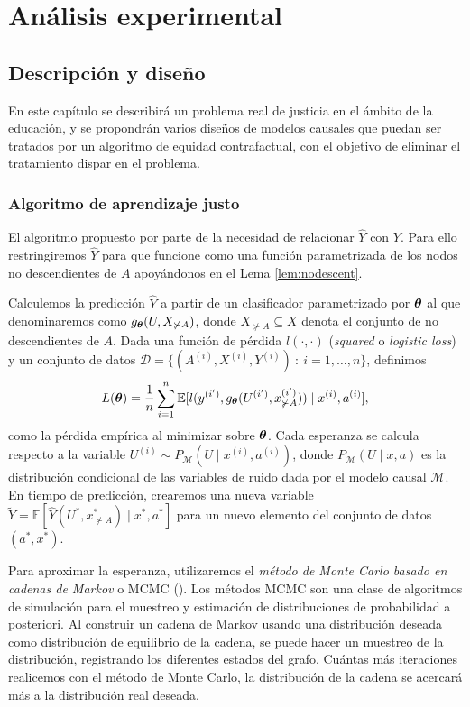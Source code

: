 \documentclass[oneside,openright,titlepage,numbers=noenddot,openany,headinclude,footinclude=true,
cleardoublepage=empty,abstractoff,BCOR=5mm,paper=a4,fontsize=12pt,main=spanish]{scrreprt}
\begin{document}
\part{Análisis experimental}  \label{part:analisis_exp}


\chapter{Descripción y diseño} \label{ch:descdise}

En este capítulo se describirá un problema real de justicia en el ámbito de la educación, y se propondrán varios diseños de modelos causales que puedan ser tratados por un algoritmo de equidad contrafactual, con el objetivo de eliminar el tratamiento dispar en el problema.

\section{Algoritmo de aprendizaje justo}

\label{sec:algoritmo}

El algoritmo propuesto por \cite{counterfactual2018} parte de la necesidad de relacionar $\hat{Y}$ con $Y$. Para ello restringiremos $\hat{Y}$ para que funcione como una función parametrizada de los nodos no descendientes de $A$ apoyándonos en el Lema \ref{lem:nodescent}. 

Calculemos la predicción $\hat{Y}$ a partir de un clasificador parametrizado por $\bm{\theta}$ al que denominaremos como $g_{\bm{\theta}}(U,X_{\not \succ A})$, donde $X_{\not \succ A} \subseteq X$ denota el conjunto de no descendientes de $A$. Dada una función de pérdida $l(\cdot,\cdot)$ (\textit{squared} o \textit{logistic loss}) y un conjunto de datos $\mathcal{D}=\{(A^{(i)},X^{(i)},Y^{(i)}) \ : \ i=1,\dots,n\}$, definimos $$L(\bm{\theta})=\displaystyle \frac{1}{n} \sum_{i=1}^n \mathbb{E}[l(y^{(i')},g_{\bm{\theta}}(U^{(i')},x_{\not \succ A}^{(i')}))\mid x^{(i)},a^{(i)}],$$ como la pérdida empírica al minimizar sobre $\bm{\theta}$. Cada esperanza se calcula respecto a la variable $U^{(i)} \sim P_{\mathcal{M}}(U \mid x^{(i)},a^{(i)})$, donde $P_{\mathcal{M}}(U \mid x,a)$ es la distribución condicional de las variables de ruido dada por el modelo causal $\mathcal{M}$. En tiempo de predicción, crearemos una nueva variable $\tilde{Y}=\mathbb{E}[\hat{Y}(U^\ast,x_{\not \succ A}^\ast)\mid x^\ast, a^\ast]$ para un nuevo elemento del conjunto de datos $(a^\ast,x^\ast)$. 

Para aproximar la esperanza, utilizaremos el \textit{método de Monte Carlo basado en cadenas de Markov} o MCMC (\cite{mcmc2003}). Los métodos MCMC son una clase de algoritmos de simulación para el muestreo y estimación de distribuciones de probabilidad a posteriori. Al construir un cadena de Markov usando una distribución deseada como distribución de equilibrio de la cadena, se puede hacer un muestreo de la distribución, registrando los diferentes estados del grafo. Cuántas más iteraciones realicemos con el método de Monte Carlo, la distribución de la cadena se acercará más a la distribución real deseada.
\end{document}
